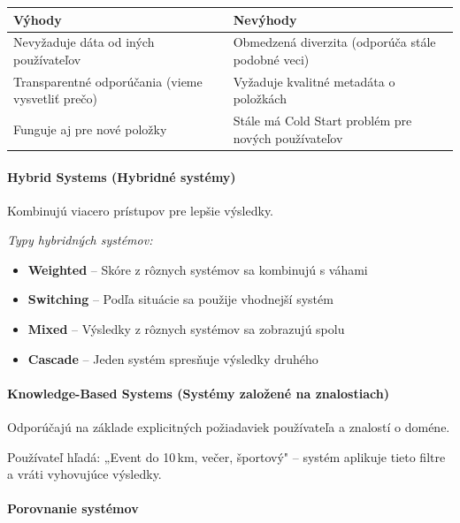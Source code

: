 \begin{table}[h!]
\centering
\renewcommand{\arraystretch}{1.5}
\begin{tabular}{p{} p{}}
\toprule
\textbf{Výhody} & \textbf{Nevýhody} \\
\midrule
Nevyžaduje dáta od iných používateľov &
Obmedzená diverzita (odporúča stále podobné veci) \\[0.8em]
Transparentné odporúčania (vieme vysvetliť prečo) &
Vyžaduje kvalitné metadáta o položkách \\[0.8em]
Funguje aj pre nové položky &
Stále má Cold Start problém pre nových používateľov \\
\bottomrule
\end{tabular}
\end{table}

\paragraph{Hybrid Systems (Hybridné systémy)}

Kombinujú viacero prístupov pre lepšie výsledky.

\textit{Typy hybridných systémov:}
\begin{itemize}
    \item \textbf{Weighted} -- Skóre z rôznych systémov sa kombinujú s váhami
    \item \textbf{Switching} -- Podľa situácie sa použije vhodnejší systém
    \item \textbf{Mixed} -- Výsledky z rôznych systémov sa zobrazujú spolu
    \item \textbf{Cascade} -- Jeden systém spresňuje výsledky druhého
\end{itemize}

\paragraph{Knowledge-Based Systems (Systémy založené na znalostiach)}

Odporúčajú na základe explicitných požiadaviek používateľa a znalostí o doméne.

Používateľ hľadá: „Event do 10\,km, večer, športový" -- systém aplikuje tieto filtre a vráti vyhovujúce výsledky.

\paragraph{Porovnanie systémov}


